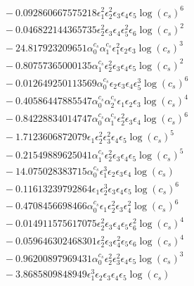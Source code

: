 \documentclass[10pt]{article}
\begin{document}
\begin{align*}
&{}  - 0.092860667575218 \epsilon_{1}^{2} \epsilon_{2}^{2} \epsilon_{3} \epsilon_{4} \epsilon_{5} \log{\left(c_{s} \right)}^{6} \\
&{}  - 0.046822144365735 \epsilon_{2}^{2} \epsilon_{3} \epsilon_{4} \epsilon_{5}^{2} \epsilon_{6} \log{\left(c_{s} \right)}^{2} \\
&{}  - 24.817923209651 \alpha_{0}^{c_s} \alpha_{1}^{c_s} \epsilon_{1}^{2} \epsilon_{2} \epsilon_{3} \log{\left(c_{s} \right)}^{3} \\
&{}  - 0.80757365000135 \alpha_{1}^{c_s} \epsilon_{2}^{2} \epsilon_{3} \epsilon_{4} \epsilon_{5} \log{\left(c_{s} \right)}^{2} \\
&{}  - 0.012649250113569 \alpha_{0}^{c_s} \epsilon_{2} \epsilon_{3} \epsilon_{4} \epsilon_{5}^{3} \log{\left(c_{s} \right)}^{6} \\
&{}  - 0.40586447885547 \alpha_{0}^{c_s} \alpha_{2}^{c_s} \epsilon_{1} \epsilon_{2} \epsilon_{3} \log{\left(c_{s} \right)}^{4} \\
&{}  - 0.84228834014747 \alpha_{0}^{c_s} \alpha_{1}^{c_s} \epsilon_{2}^{2} \epsilon_{3} \epsilon_{4} \log{\left(c_{s} \right)}^{6} \\
&{}  - 1.7123606872079 \epsilon_{1} \epsilon_{2}^{2} \epsilon_{3}^{2} \epsilon_{4} \epsilon_{5} \log{\left(c_{s} \right)}^{5} \\
&{}  - 0.21549889625041 \alpha_{1}^{c_s} \epsilon_{2}^{2} \epsilon_{3} \epsilon_{4} \epsilon_{5} \log{\left(c_{s} \right)}^{5} \\
&{}  - 14.075028383715 \alpha_{0}^{c_s} \epsilon_{1}^{3} \epsilon_{2} \epsilon_{3} \epsilon_{4} \log{\left(c_{s} \right)} \\
&{}  - 0.11613239792864 \epsilon_{1} \epsilon_{2}^{3} \epsilon_{3} \epsilon_{4} \epsilon_{5} \log{\left(c_{s} \right)}^{6} \\
&{}  - 0.4708456698466 \alpha_{0}^{c_s} \epsilon_{1} \epsilon_{2}^{2} \epsilon_{3} \epsilon_{4}^{2} \log{\left(c_{s} \right)}^{6} \\
&{}  - 0.014911575617075 \epsilon_{2}^{2} \epsilon_{3} \epsilon_{4} \epsilon_{5} \epsilon_{6}^{2} \log{\left(c_{s} \right)}^{4} \\
&{}  - 0.059646302468301 \epsilon_{2}^{2} \epsilon_{3} \epsilon_{4}^{2} \epsilon_{5} \epsilon_{6} \log{\left(c_{s} \right)}^{4} \\
&{}  - 0.96200897969431 \alpha_{0}^{c_s} \epsilon_{2}^{2} \epsilon_{3}^{2} \epsilon_{4} \epsilon_{5} \log{\left(c_{s} \right)}^{3} \\
&{}  - 3.8685809848949 \epsilon_{1}^{3} \epsilon_{2} \epsilon_{3} \epsilon_{4} \epsilon_{5} \log{\left(c_{s} \right)} \\

\end{align*}
\end{document}
